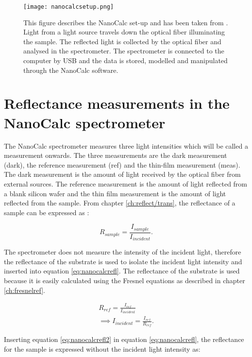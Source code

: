 \documentclass[MasterThesisMain.tex]{subfiles}
\begin{document}
	\begin{figure}
	\centering
		\texttt{[image: nanocalcsetup.png]}
		\caption{This figure describes the NanoCalc set-up and has been taken from \cite{nanocalcmanual}. Light from a light source travels down the optical fiber illuminating the sample. The reflected light is collected by the optical fiber and analysed in the spectrometer. The spectrometer is connected to the computer by USB and the data is stored, modelled and manipulated through the NanoCalc software.}
		\label{fig:nanocalcsetup}
	\end{figure}
	
\section{Reflectance measurements in the NanoCalc spectrometer}
The NanoCalc spectrometer measures three light intensities which will be called a measurement onwards. The three measurements are the dark measurement (dark), the reference measurement (ref) and the thin-film measurement (meas). The dark measurement is the amount of light received by the optical fiber from external sources. The reference measurement is the amount of light reflected from a blank silicon wafer and the thin film measurement is the amount of light reflected from the sample. From chapter \ref{ch:reflect/trans}, the reflectance of a sample can be expressed as :

\begin{equation}\label{eq:nanocalcrefl}
R_{sample} = \frac{I_{sample}}{I_{incident}}.
\end{equation}

The spectrometer does not measure the intensity of the incident light, therefore the reflectance of the substrate is used to isolate the incident light intensity and inserted into equation \ref{eq:nanocalcrefl}. The reflectance of the substrate is used because it is easily calculated using the Fresnel equations as described in chapter \ref{ch:fresnelref}.

\begin{align}
R_{ref} = \frac{I_{ref}}{I_{incident}}\\
\implies  I_{incident} = \frac{I_{ref}}{R_{ref}} \label{eq:nanocalcrefl2}.
\end{align}

Inserting equation \ref{eq:nanocalcrefl2} in equation \ref{eq:nanocalcrefl}, the reflectance for the sample is expressed without the incident light intensity as:
\end{document}

